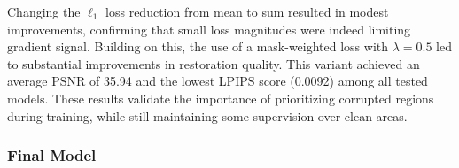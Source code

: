 \documentclass[10pt,a4paper,twocolumn,twoside]{article}
\begin{document}
Changing the $\ell_1$ loss reduction from mean to sum resulted in modest improvements, confirming that small loss magnitudes were indeed limiting gradient signal. Building on this, the use of a mask-weighted loss with $\lambda = 0.5$ led to substantial improvements in restoration quality. This variant achieved an average PSNR of 35.94 and the lowest LPIPS score (0.0092) among all tested models. These results validate the importance of prioritizing corrupted regions during training, while still maintaining some supervision over clean areas.
\begin{table}
\begin{center}
\caption{ \small Comparison of final models across seen and unseen data. The One-Stage Final Model clearly outperforms the two-stage pretrained U-Net baselines both in restoration quality and inference speed. In \textbf{bold} the best result in each metric, and underlined the second best.}
\label{table:final_model_results}
\vspace{-2mm}
\setlength{\tabcolsep}{10pt}
\end{center}
\vspace{-1.5em}
\end{table}
\subsubsection{Final Model}
\end{document}
